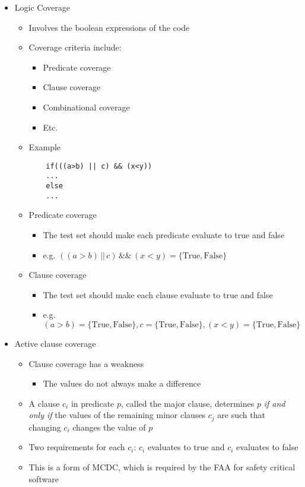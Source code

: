 \begin{itemize}
	\item Logic Coverage
	\begin{itemize}
		\item Involves the boolean expressions of the code
		\item Coverage criteria include:
		\begin{itemize}
			\item Predicate coverage
			\item Clause coverage
			\item Combinational coverage
			\item Etc.
		\end{itemize}
		\item Example
		\begin{Verbatim}
	if(((a>b) || c) && (x<y))
	...
	else
	...
		\end{Verbatim}
		\item Predicate coverage
		\begin{itemize}
			\item The test set should make each predicate evaluate to true and false
			\item e.g. $ ((a>b) \, || \, c) \, \&\& \, (x<y) = \{\text{True}, \text{False}\} $
		\end{itemize}
		\item Clause coverage
		\begin{itemize}
			\item The test set should make each clause evaluate to true and false
			\item e.g. $ (a>b) = \{\text{True}, \text{False}\}, c = \{\text{True}, \text{False}\}, (x<y) = \{\text{True}, \text{False}\} $
		\end{itemize}
	\end{itemize}

	\item Active clause coverage
	\begin{itemize}
		\item Clause coverage has a weakness
		\begin{itemize}
			\item The values do not always make a difference
		\end{itemize}
		\item A clause $ c_i$ in predicate $ p $, called the major clause, determines $ p $ \textit{if and only if} the values of the remaining minor clauses $ c_j $ are such that changing $ c_i $ changes the value of $ p $
		\item Two requirements for each $ c_i $: $ c_i $ evaluates to true and $ c_i $ evaluates to false
		\item This is a form of MCDC, which is required by the FAA for safety critical
		software


\end{itemize}
\end{itemize}
